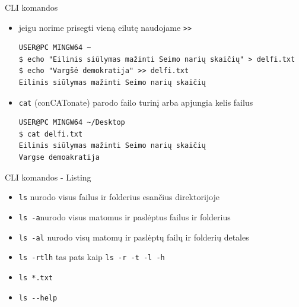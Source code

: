 \documentclass[11pt,xcolor=table]{beamer}
\begin{document}
\begin{frame}[fragile]{CLI komandos}

\begin{itemize}

\item jeigu norime prisegti vieną eilutę naudojame \colorbox{listinggray}{\lstinline|>>|}
\begin{lstlisting}
USER@PC MINGW64 ~
$ echo "Eilinis siūlymas mažinti Seimo narių skaičių" > delfi.txt
$ echo "Vargšė demokratija" >> delfi.txt
Eilinis siūlymas mažinti Seimo narių skaičių
\end{lstlisting}

\item \colorbox{listinggray}{\lstinline|cat|} (conCATonate) parodo failo turinį arba apjungia kelis failus
\begin{lstlisting}
USER@PC MINGW64 ~/Desktop
$ cat delfi.txt
Eilinis siūlymas mažinti Seimo narių skaičių
Vargse demoakratija
\end{lstlisting}


\end{itemize}
\end{frame}
\begin{frame}{CLI komandos - Listing}
\begin{itemize}
\item \colorbox{listinggray}{\lstinline|ls|} nurodo visus failus ir folderius esančius direktorijoje
\item \colorbox{listinggray}{\lstinline|ls -a|}nurodo visus matomus ir paslėptus failus ir folderius
\item \colorbox{listinggray}{\lstinline|ls -al|} nurodo visų matomų ir paslėptų failų ir folderių detales
\item \colorbox{listinggray}{\lstinline|ls -rtlh|} tas pats kaip \colorbox{listinggray}{\lstinline|ls -r -t -l -h|}
\item \colorbox{listinggray}{\lstinline|ls *.txt|}
\item \colorbox{listinggray}{\lstinline|ls --help|} 
\end{itemize}
\end{frame}
\end{document}

